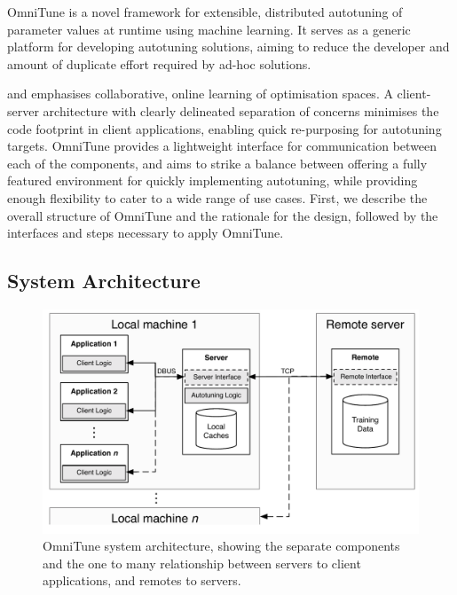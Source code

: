 \documentclass[nonatbib,preprint,9pt]{sigplanconf}
\begin{document}
OmniTune is a novel framework for extensible, distributed autotuning
of parameter values at runtime using machine learning. It serves as a
generic platform for developing autotuning solutions, aiming to reduce
the developer and amount of duplicate effort required by ad-hoc
solutions.

and emphasises collaborative, online learning of optimisation
spaces. A client-server architecture with clearly delineated
separation of concerns minimises the code footprint in client
applications, enabling quick re-purposing for autotuning
targets. OmniTune provides a lightweight interface for communication
between each of the components, and aims to strike a balance between
offering a fully featured environment for quickly implementing
autotuning, while providing enough flexibility to cater to a wide
range of use cases. First, we describe the overall structure of
OmniTune and the rationale for the design, followed by the interfaces
and steps necessary to apply OmniTune.


\subsection{System Architecture}

\begin{figure}
\centering
\includegraphics[width=.98\columnwidth]{img/omnitune-system-overview.pdf}
\caption[OmniTune system diagram]{%
  OmniTune system architecture, showing the separate components and
  the one to many relationship between servers to client applications,
  and remotes to servers.%
}
\label{fig:omnitune-system-overview}
\end{figure}
\end{document}
